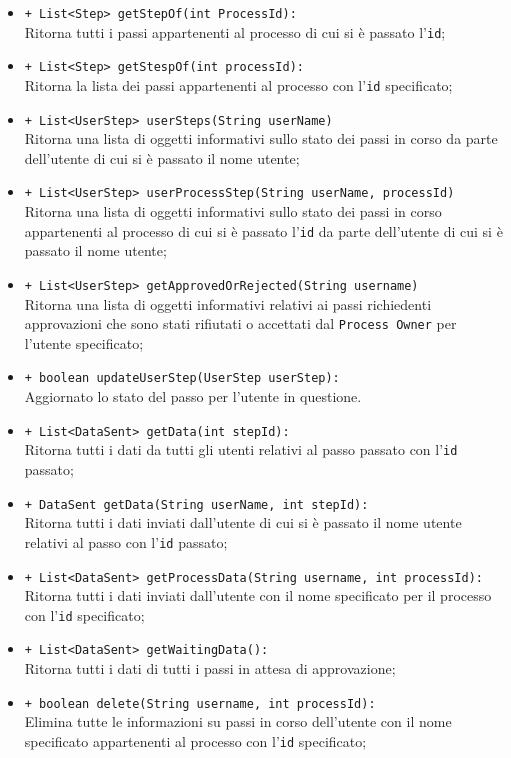 \begin{flushleft}
\begin{itemize}
\begin{sloppypar}
\begin{itemize}
\item \texttt{+ List<Step> getStepOf(int ProcessId):}\\ Ritorna tutti i passi appartenenti al processo di cui si è passato l'\texttt{id};
\item \texttt{+ List<Step> getStespOf(int processId):} \\Ritorna la lista dei passi appartenenti al processo con l'\texttt{id} specificato;
\item \texttt{+ List<UserStep> userSteps(String userName)}\\ Ritorna una lista di oggetti informativi sullo stato dei passi in corso da parte dell'utente di cui si è passato il nome utente;
\item \texttt{+ List<UserStep> userProcessStep(String userName, processId)}\\ Ritorna una lista di oggetti informativi sullo stato dei passi in corso appartenenti al processo di cui si è passato l'\texttt{id} da parte dell'utente di cui si è passato il nome utente;
\item \texttt{+ List<UserStep> getApprovedOrRejected(String username)}\\ Ritorna una lista di oggetti informativi relativi ai passi richiedenti approvazioni che sono stati rifiutati o accettati dal \texttt{Process Owner} per l'utente specificato;
\item \texttt{+ boolean updateUserStep(UserStep userStep):}\\ Aggiornato lo stato del passo per l'utente in questione.
\item \texttt{+ List<DataSent> getData(int stepId):}\\ Ritorna tutti i dati da tutti gli utenti relativi al passo passato con l'\texttt{id} passato;
\item \texttt{+ DataSent getData(String userName, int stepId):}\\ Ritorna tutti i dati inviati dall'utente di cui si è passato il nome utente relativi al passo con l'\texttt{id} passato;
\item \texttt{+ List<DataSent> getProcessData(String username, int processId):} Ritorna tutti i dati inviati dall'utente con il nome specificato per il processo con l'\texttt{id} specificato;
\item \texttt{+ List<DataSent> getWaitingData():}\\ Ritorna tutti i dati di tutti i passi in attesa di approvazione;
\item \texttt{+ boolean delete(String username, int processId):}\\ Elimina tutte le informazioni su passi in corso dell'utente con il nome specificato appartenenti al processo con l'\texttt{id} specificato;

\end{itemize}
\end{sloppypar}
\end{itemize}
\end{flushleft}
